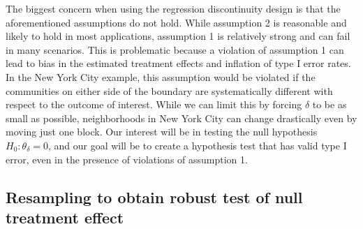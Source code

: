 \documentclass[a4paper,11pt]{article}
\begin{document}
The biggest concern when using the regression discontinuity design is that the aforementioned assumptions do not hold. While assumption 2 is reasonable and likely to hold in most applications, assumption 1 is relatively strong and can fail in many scenarios. This is problematic because a violation of assumption 1 can lead to bias in the estimated treatment effects and inflation of type I error rates. In the New York City example, this assumption would be violated if the communities on either side of the boundary are systematically different with respect to the outcome of interest. While we can limit this by forcing $\delta$ to be as small as possible, neighborhoods in New York City can change drastically even by moving just one block. Our interest will be in testing the null hypothesis $H_0: \theta_{\delta} = 0$, and our goal will be to create a hypothesis test that has valid type I error, even in the presence of violations of assumption 1. 

\subsection{Resampling to obtain robust test of null treatment effect}
\end{document}
